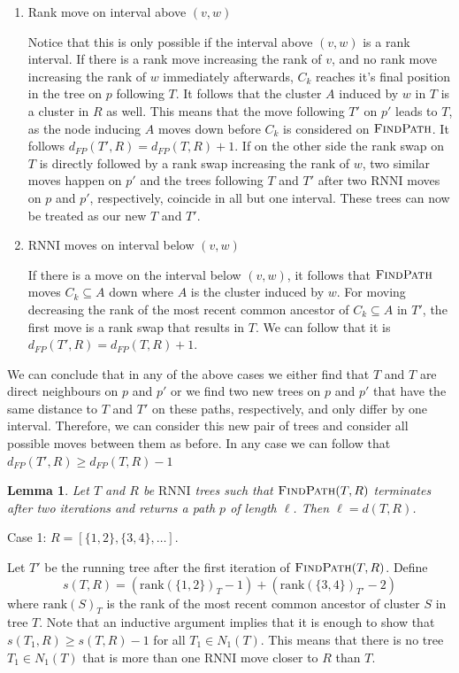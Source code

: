 \documentclass{amsart}
\newtheorem{lemma}{Lemma}
\newcommand{\rnni}{\mathrm{RNNI}}
\newcommand{\findpath}{\textsc{FindPath}}
\newcommand{\rank}{\mathrm{rank}}
\begin{document}
\begin{enumerate}
    \item Rank move on interval above $(v,w)$

    Notice that this is only possible if the interval above $(v,w)$ is a rank interval.
    If there is a rank move increasing the rank of $v$, and no rank move increasing the rank of $w$ immediately afterwards, $C_k$ reaches it's final position in the tree on $p$ following $T$.
    It follows that the cluster $A$ induced by $w$ in $T$ is a cluster in $R$ as well.
    This means that the move following $T'$ on $p'$ leads to $T$, as the node inducing $A$ moves down before $C_k$ is considered on $\findpath$.
    It follows $d_{FP}(T',R) = d_{FP}(T,R) + 1$.
    If on the other side the rank swap on $T$ is directly followed by a rank swap increasing the rank of $w$, two similar moves happen on $p'$ and the trees following $T$ and $T'$ after two $\rnni$ moves on $p$ and $p'$, respectively, coincide in all but one interval.
    These trees can now be treated as our new $T$ and $T'$.

    \item $\rnni$ moves on interval below $(v,w)$

    If there is a move on the interval below $(v,w)$, it follows that $\findpath$ moves $C_k \subseteq A$ down where $A$ is the cluster induced by $w$.
    For moving decreasing the rank of the most recent common ancestor of $C_k \subseteq A$ in $T'$, the first move is a rank swap that results in $T$.
    We can follow that it is  $d_{FP}(T',R) = d_{FP}(T,R) + 1$.
\end{enumerate}

We can conclude that in any of the above cases we either find that $T$ and $T$ are direct neighbours on $p$ and $p'$ or we find two new trees on $p$ and $p'$ that have the same distance to $T$ and $T'$ on these paths, respectively, and only differ by one interval.
Therefore, we can consider this new pair of trees and consider all possible moves between them as before.
In any case we can follow that $d_{FP}(T',R) \geq d_{FP}(T,R) -1$

\endproof

\begin{lemma}
Let $T$ and $R$ be $\rnni$ trees such that $\findpath(T, R)$ terminates after two iterations and returns a path $p$ of length $\ell$.
Then $\ell = d(T, R)$.
\end{lemma}

\proof
Case 1: $R = [\{1, 2\}, \{3, 4\}, \ldots]$.

Let $T'$ be the running tree after the first iteration of $\findpath(T, R)$.
Define
\[
s(T, R) = (\rank(\{1,2\})_T - 1) + (\rank(\{3,4\})_{T'} - 2)
\]
where $\rank(S)_T$ is the rank of the most recent common ancestor of cluster $S$ in tree $T$.
Note that an inductive argument implies that it is enough to show that $s(T_1, R) \geq s(T, R) - 1$ for all $T_1 \in N_1(T)$.
This means that there is no tree $T_1 \in N_1(T)$ that is more than one $\rnni$ move closer to $R$ than $T$.
\end{document}
